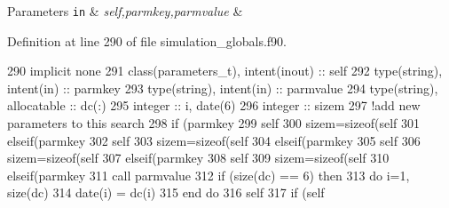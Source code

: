 \begin{DoxyParams}[1]{Parameters}
\mbox{\tt in}  & {\em self,parmkey,parmvalue} & \\
\hline
\end{DoxyParams}


Definition at line 290 of file simulation\+\_\+globals.\+f90.


\begin{DoxyCode}
290     \textcolor{keywordtype}{implicit none}
291     \textcolor{keywordtype}{class}(parameters\_t), \textcolor{keywordtype}{intent(inout)} :: self
292     \textcolor{keywordtype}{type}(string), \textcolor{keywordtype}{intent(in)} :: parmkey
293     \textcolor{keywordtype}{type}(string), \textcolor{keywordtype}{intent(in)} :: parmvalue
294     \textcolor{keywordtype}{type}(string), \textcolor{keywordtype}{allocatable} :: dc(:)
295     \textcolor{keywordtype}{integer} :: i, date(6)
296     \textcolor{keywordtype}{integer} :: sizem
297     \textcolor{comment}{!add new parameters to this search}
298     \textcolor{keywordflow}{if} (parmkey%
299         self%
300         sizem=sizeof(self%
301     \textcolor{keywordflow}{elseif}(parmkey%
302         self%
303         sizem=sizeof(self%
304     \textcolor{keywordflow}{elseif}(parmkey%
305         self%
306         sizem=sizeof(self%
307     \textcolor{keywordflow}{elseif}(parmkey%
308         self%
309         sizem=sizeof(self%
310     \textcolor{keywordflow}{elseif}(parmkey%
311         \textcolor{keyword}{call }parmvalue%
312         \textcolor{keywordflow}{if} (\textcolor{keyword}{size}(dc) == 6) \textcolor{keywordflow}{then}
313             \textcolor{keywordflow}{do} i=1, \textcolor{keyword}{size}(dc)
314                 date(i) = dc(i)%
315 \textcolor{keywordflow}{            end do}
316             self%
317             \textcolor{keywordflow}{if} (self%

\end{DoxyCode}
